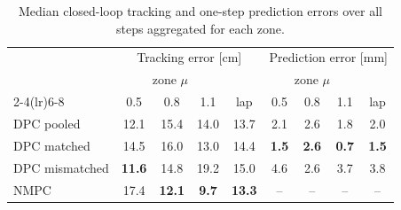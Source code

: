 \begin{table}[!t]
\caption{Median closed-loop tracking and one-step prediction errors over all steps aggregated for each zone.}
\label{tab:tracking}
\centering
\setlength{\tabcolsep}{2.9pt}
\begin{tabular}{l cccc cccc}
\toprule
 & \multicolumn{4}{c}{Tracking error [cm]} & \multicolumn{4}{c}{Prediction error [mm]} \\
 & \multicolumn{3}{c}{zone $\mu$} & & \multicolumn{3}{c}{zone $\mu$} & \\
\cmidrule(lr){2-4}\cmidrule(lr){6-8}
 & 0.5 & 0.8 & 1.1 & lap & 0.5 & 0.8 & 1.1 & lap \\
\midrule
DPC pooled & 12.1 & 15.4 & 14.0 & 13.7 & 2.1 & 2.6 & 1.8 & 2.0 \\
DPC matched & 14.5 & 16.0 & 13.0 & 14.4 & \textbf{1.5} & \textbf{2.6} & \textbf{0.7} & \textbf{1.5} \\
DPC mismatched & \textbf{11.6} & 14.8 & 19.2 & 15.0 & 4.6 & 2.6 & 3.7 & 3.8 \\
NMPC & 17.4 & \textbf{12.1} & \textbf{9.7} & \textbf{13.3} & -- & -- & -- & -- \\
\bottomrule
\end{tabular}
\end{table}
